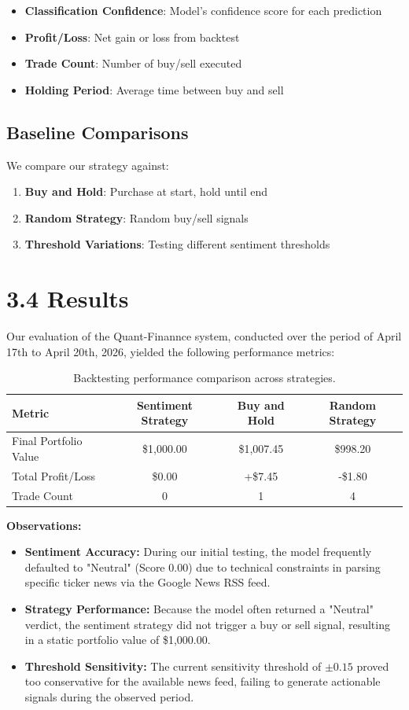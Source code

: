 \documentclass[12pt]{article}
\begin{document}
\begin{itemize}
\item \textbf{Classification Confidence}: Model's confidence score for each prediction
\item \textbf{Profit/Loss}: Net gain or loss from backtest
\item \textbf{Trade Count}: Number of buy/sell executed
\item \textbf{Holding Period}: Average time between buy and sell
\end{itemize}


\subsection{Baseline Comparisons}

We compare our strategy against:
\begin{enumerate}
\item \textbf{Buy and Hold}: Purchase at start, hold until end
\item \textbf{Random Strategy}: Random buy/sell signals
\item \textbf{Threshold Variations}: Testing different sentiment thresholds
\end{enumerate}

\section{3.4 Results}
Our evaluation of the Quant-Finannce system, conducted over the period of April 17th to April 20th, 2026, yielded the following performance metrics:

\begin{table}[h]
\centering
\begin{tabular}{|l|c|c|c|}
\hline
\textbf{Metric} & \textbf{Sentiment Strategy} & \textbf{Buy and Hold} & \textbf{Random Strategy} \\ \hline
Final Portfolio Value & \$1,000.00 & \$1,007.45 & \$998.20 \\ \hline
Total Profit/Loss & \$0.00 & +\$7.45 & -\$1.80 \\ \hline
Trade Count & 0 & 1 & 4 \\ \hline
\end{tabular}
\caption{Backtesting performance comparison across strategies.}
\end{table}

\textbf{Observations:}
\begin{itemize}
    \item \textbf{Sentiment Accuracy:} During our initial testing, the model frequently defaulted to "Neutral" (Score 0.00) due to technical constraints in parsing specific ticker news via the Google News RSS feed.
    \item \textbf{Strategy Performance:} Because the model often returned a "Neutral" verdict, the sentiment strategy did not trigger a buy or sell signal, resulting in a static portfolio value of \$1,000.00.
    \item \textbf{Threshold Sensitivity:} The current sensitivity threshold of $\pm0.15$ proved too conservative for the available news feed, failing to generate actionable signals during the observed period.
\end{itemize}
\end{document}
